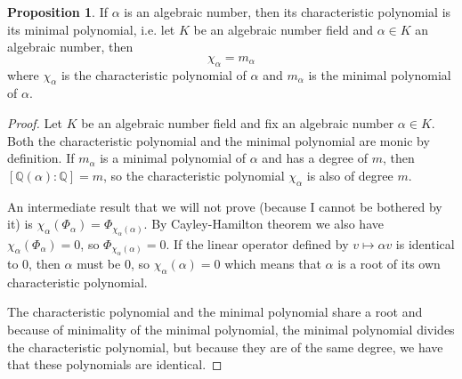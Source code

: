 \documentclass[a4paper]{book}
\theoremstyle{definition}
\newtheorem{proposition}[definition]{Proposition}
\begin{document}
\begin{thmbox}
    \begin{proposition}
        If \(\alpha\) is an algebraic number, then its characteristic polynomial is its minimal polynomial, i.e. let \(K\) be an algebraic number field and \(\alpha \in K\) an algebraic number, then
        \begin{equation*}
            \chi_\alpha = m_\alpha
        \end{equation*}
        where \(\chi_\alpha\) is the characteristic polynomial of \(\alpha\) and \(m_\alpha\) is the minimal polynomial of \(\alpha\).
    \end{proposition}
\end{thmbox}
\begin{proof}
    Let \(K\) be an algebraic number field and fix an algebraic number \(\alpha \in K\). Both the characteristic polynomial and the minimal polynomial are monic by definition. If \(m_\alpha\) is a minimal polynomial of \(\alpha\) and has a degree of \(m\), then \([\mathbb{Q}(\alpha) : \mathbb{Q}] = m\), so the characteristic polynomial \(\chi_\alpha\) is also of degree \(m\).

    An intermediate result that we will not prove (because I cannot be bothered by it) is \(\chi_\alpha(\Phi_\alpha) = \Phi_{\chi_\alpha(\alpha)}\). By Cayley-Hamilton theorem we also have \(\chi_\alpha(\Phi_\alpha) = 0\), so \(\Phi_{\chi_\alpha(\alpha)} = 0\). If the linear operator defined by \(v \mapsto \alpha v\) is identical to \(0\), then \(\alpha\) must be \(0\), so \(\chi_\alpha(\alpha) = 0\) which means that \(\alpha\) is a root of its own characteristic polynomial.

    The characteristic polynomial and the minimal polynomial share a root and because of minimality of the minimal polynomial, the minimal polynomial divides the characteristic polynomial, but because they are of the same degree, we have that these polynomials are identical.
\end{proof}
\end{document}
